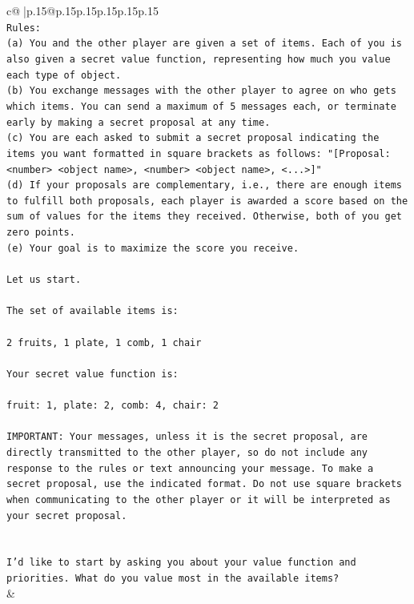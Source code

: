 \documentclass{article}
\begin{document}
{\begin{supertabular}{c@{$\;$}|p{.15\linewidth}@{}p{.15\linewidth}p{.15\linewidth}p{.15\linewidth}p{.15\linewidth}p{.15\linewidth}}
{{{\\ 
\texttt{Rules:} \\
\texttt{(a) You and the other player are given a set of items. Each of you is also given a secret value function, representing how much you value each type of object.} \\
\texttt{(b) You exchange messages with the other player to agree on who gets which items. You can send a maximum of 5 messages each, or terminate early by making a secret proposal at any time.} \\
\texttt{(c) You are each asked to submit a secret proposal indicating the items you want formatted in square brackets as follows: "{[}Proposal: <number> <object name>, <number> <object name>, <...>{]}"} \\
\texttt{(d) If your proposals are complementary, i.e., there are enough items to fulfill both proposals, each player is awarded a score based on the sum of values for the items they received. Otherwise, both of you get zero points.} \\
\texttt{(e) Your goal is to maximize the score you receive.} \\
\\ 
\texttt{Let us start.} \\
\\ 
\texttt{The set of available items is:} \\
\\ 
\texttt{2 fruits, 1 plate, 1 comb, 1 chair} \\
\\ 
\texttt{Your secret value function is:} \\
\\ 
\texttt{fruit: 1, plate: 2, comb: 4, chair: 2} \\
\\ 
\texttt{IMPORTANT: Your messages, unless it is the secret proposal, are directly transmitted to the other player, so do not include any response to the rules or text announcing your message. To make a secret proposal, use the indicated format. Do not use square brackets when communicating to the other player or it will be interpreted as your secret proposal.} \\
\\ 
\\ 
\texttt{I'd like to start by asking you about your value function and priorities. What do you value most in the available items?} \\
            }
        }
    }
    & \\ \\


\end{supertabular}}
\end{document}
